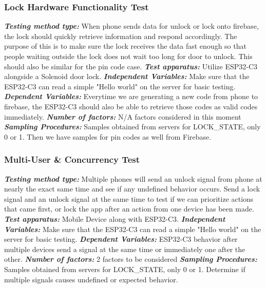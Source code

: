 \documentclass[a4paper,12pt]{article}
\begin{document}
\subsubsection{Lock Hardware Functionality Test}
\textbf{\textit{Testing method type:}} When phone sends data for unlock or lock onto firebase, the lock should quickly retrieve information and respond accordingly. The purpose of this is to make sure the lock receives the data fast enough so that people waiting outside the lock does not wait too long for door to unlock. This should also be similar for the pin code case.
\newline
\textbf{\textit{Test apparatus:}} Utilize ESP32-C3 alongside a Solenoid door lock.
\newline
\textbf{\textit{Independent Variables:}} Make sure that the ESP32-C3 can read a simple "Hello world" on the server for basic testing.
\newline
\textbf{\textit{Dependent Variables:}} Everytime we are generating a new code from phone to firebase, the ESP32-C3 should also be able to retrieve those codes as valid codes immediately.
\newline
\textbf{\textit{Number of factors:}} N/A factors considered in this moment
\newline
\textbf{\textit{Sampling Procedures:}} Samples obtained from servers for LOCK\_STATE, only 0 or 1. Then we have samples for pin codes as well from Firebase.
\newline

\subsubsection{Multi-User \& Concurrency Test}
\textbf{\textit{Testing method type:}} Multiple phones will send an unlock signal from phone at nearly the exact same time and see if any undefined behavior occurs. Send a lock signal and an unlock signal at the same time to test if we can prioritize actions that came first, or lock the app after an action from one device has been made.
\newline
\textbf{\textit{Test apparatus:}} Mobile Device along with ESP32-C3.
\newline
\textbf{\textit{Independent Variables:}} Make sure that the ESP32-C3 can read a simple "Hello world" on the server for basic testing.
\newline
\textbf{\textit{Dependent Variables:}} ESP32-C3 behavior after multiple devices send a signal at the same time or immediately one after the other.
\newline
\textbf{\textit{Number of factors:}} 2 factors to be considered
\newline
\textbf{\textit{Sampling Procedures:}} Samples obtained from servers for LOCK\_STATE, only 0 or 1. Determine if multiple signals causes undefined or expected behavior.
\end{document}
